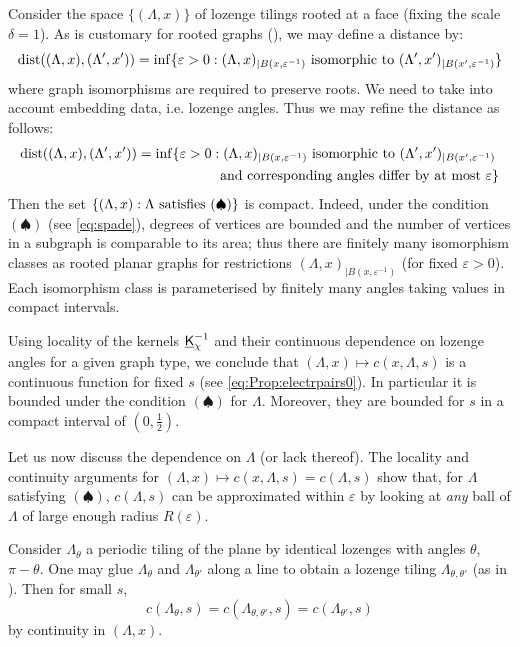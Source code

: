 \documentclass[10pt]{article}
\newcommand{\eps}{\varepsilon}
\newcommand{\uK}{{\underline {\sf K}}}
\begin{document}
Consider the space $\{(\Lambda,x)\}$ of lozenge tilings rooted at a face (fixing the scale $\delta=1$). As is customary for rooted graphs (\cite{BenSch_rec}), we may define a distance by:
$${\rm dist}((\Lambda,x),(\Lambda',x'))=\inf\{\eps>0:(\Lambda,x)_{|B(x,\eps^{-1})}{\rm\ isomorphic\ to\ }(\Lambda',x')_{|B(x',\eps^{-1})}\}$$
where graph isomorphisms are required to preserve roots. We need to take into account embedding data, i.e. lozenge angles. Thus we may refine the distance as follows:
\begin{align*}
{\rm dist}((\Lambda,x),(\Lambda',x'))&=\inf\{\eps>0:(\Lambda,x)_{|B(x,\eps^{-1})}{\rm\ isomorphic\ to\ }(\Lambda',x')_{|B(x',\eps^{-1})}\\
&\hphantom{=\inf\{\eps>0:}{\rm\ and\ corresponding\ angles\ differ\ by\ at\ most\ }\eps\}
\end{align*}
Then the set $\{(\Lambda,x):\Lambda{\rm\ satisfies\ }(\spadesuit)\}$ is compact. Indeed, under the condition $(\spadesuit)$ (see \eqref{eq:spade}), degrees of vertices are bounded and the number of vertices in a subgraph is comparable to its area; thus there are finitely many isomorphism classes as rooted planar graphs
for restrictions $(\Lambda,x)_{|B(x,\eps^{-1})}$ (for fixed $\eps>0$). Each isomorphism class is parameterised by finitely many angles taking values in compact intervals. 

Using locality of the kernels $\uK_\chi^{-1}$ and their continuous dependence on lozenge angles for a given graph type, we conclude that $(\Lambda,x)\mapsto c(x,\Lambda,s)$ is a continuous function for fixed $s$ (see \eqref{eq:Prop:electrpairs0}). In particular it is bounded under the condition $(\spadesuit)$ for $\Lambda$. Moreover, they are bounded for $s$ in a compact interval of $(0,\frac 12)$.



Let us now discuss the dependence on $\Lambda$ (or lack thereof). The locality and continuity arguments for $(\Lambda,x)\mapsto c(x,\Lambda,s)=c(\Lambda,s)$ show that, for $\Lambda$ satisfying $(\spadesuit)$, $c(\Lambda,s)$ can be approximated within $\eps$ by looking at {\em any} ball of $\Lambda$ of large enough radius $R(\eps)$.

Consider $\Lambda_\theta$ a periodic tiling of the plane by identical lozenges with angles $\theta$, $\pi-\theta$. One may glue $\Lambda_\theta$ and $\Lambda_{\theta'}$ along a line to obtain a lozenge tiling $\Lambda_{\theta,\theta'}$ (as in \cite{GriMan_inhom}). Then for small $s$,
$$c(\Lambda_\theta,s)=c(\Lambda_{\theta,\theta'},s)=c(\Lambda_{\theta'},s)$$
by continuity in $(\Lambda,x)$. 
\end{document}
